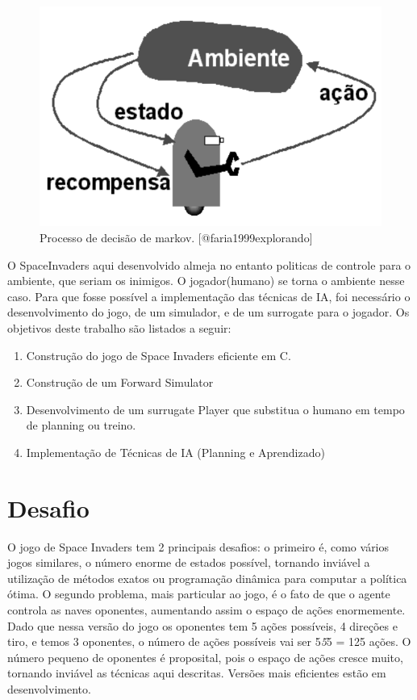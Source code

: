 \documentclass[]{book}
\providecommand{\tightlist}{%
  \setlength{\itemsep}{0pt}\setlength{\parskip}{0pt}}
\begin{document}
\begin{figure}

{\centering \includegraphics[width=0.5\linewidth]{content/imgs/agente-ambiente} 

}

\caption{Processo de decisão de markov. [@faria1999explorando]}\label{fig:pdm}
\end{figure}

O SpaceInvaders aqui desenvolvido almeja no entanto politicas de
controle para o ambiente, que seriam os inimigos. O jogador(humano) se
torna o ambiente nesse caso. Para que fosse possível a implementação das
técnicas de IA, foi necessário o desenvolvimento do jogo, de um
simulador, e de um surrogate para o jogador. Os objetivos deste trabalho
são listados a seguir:

\begin{enumerate}
\def\labelenumi{\arabic{enumi}.}
\tightlist
\item
  Construção do jogo de Space Invaders eficiente em C.
\item
  Construção de um Forward Simulator
\item
  Desenvolvimento de um surrugate Player que substitua o humano em tempo
  de planning ou treino.
\item
  Implementação de Técnicas de IA (Planning e Aprendizado)
\end{enumerate}

\chapter{Desafio}\label{desafio}

O jogo de Space Invaders tem 2 principais desafios: o primeiro é, como
vários jogos similares, o número enorme de estados possível, tornando
inviável a utilização de métodos exatos ou programação dinâmica para
computar a política ótima. O segundo problema, mais particular ao jogo,
é o fato de que o agente controla as naves oponentes, aumentando assim o
espaço de ações enormemente. Dado que nessa versão do jogo os oponentes
tem 5 ações possíveis, 4 direções e tiro, e temos 3 oponentes, o número
de ações possíveis vai ser 5\emph{5}5 = 125 ações. O número pequeno de
oponentes é proposital, pois o espaço de ações cresce muito, tornando
inviável as técnicas aqui descritas. Versões mais eficientes estão em
desenvolvimento.
\end{document}
